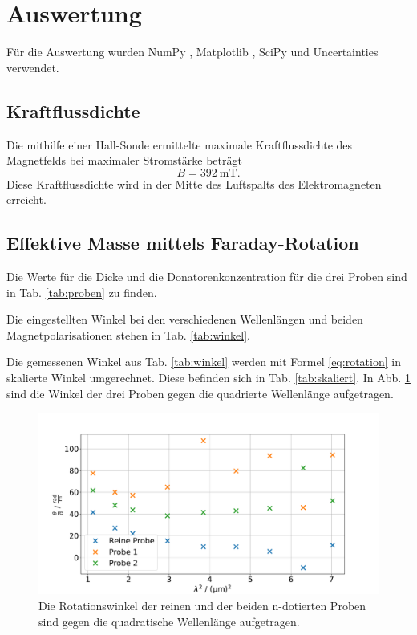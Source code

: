 \section{Auswertung}
\label{sec:Auswertung}
Für die Auswertung wurden NumPy \cite{numpy}, Matplotlib \cite{matplotlib}, SciPy \cite{scipy} und Uncertainties \cite{uncertainties} verwendet.

\subsection{Kraftflussdichte}
Die mithilfe einer Hall-Sonde ermittelte maximale Kraftflussdichte des Magnetfelds bei maximaler Stromstärke beträgt
\begin{equation*}
    B = \SI{392}{\milli\tesla}.
\end{equation*}
Diese Kraftflussdichte wird in der Mitte des Luftspalts des Elektromagneten erreicht.

\subsection{Effektive Masse mittels Faraday-Rotation}
Die Werte für die Dicke und die Donatorenkonzentration für die drei Proben sind in Tab. \ref{tab:proben} zu finden.

Die eingestellten Winkel bei den verschiedenen Wellenlängen und beiden Magnetpolarisationen stehen in Tab. \ref{tab:winkel}.

Die gemessenen Winkel aus Tab. \ref{tab:winkel} werden mit Formel \ref{eq:rotation} in skalierte Winkel umgerechnet. Diese befinden sich in Tab. \ref{tab:skaliert}. In Abb. \ref{fig:alle} sind die Winkel der drei Proben gegen die quadrierte Wellenlänge aufgetragen.

\begin{figure}
    \centering
    \includegraphics[width=\textwidth]{plots/AlleProben.pdf}
    \caption{Die Rotationswinkel der reinen und der beiden n-dotierten Proben sind gegen die quadratische Wellenlänge aufgetragen.}
    \label{fig:alle}
\end{figure}

